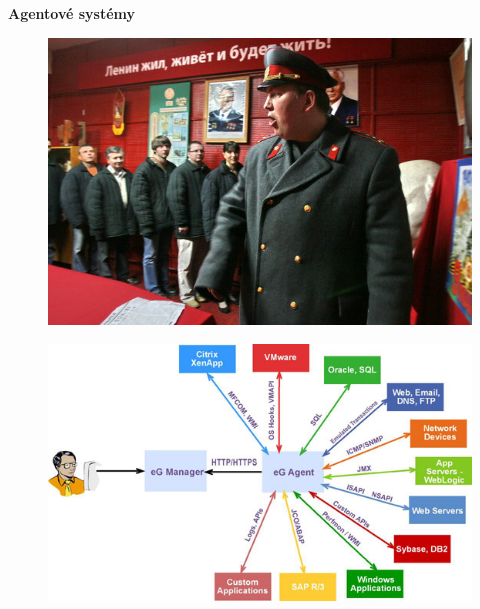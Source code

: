 \documentclass[xcolor=dvipsnames]{beamer}
\begin{document}
\begin{frame}{\bf Agentové systémy}

\begin{minipage}{.5\textwidth}

\begin{figure}[!htb]
\centering
\includegraphics[scale=.2]{../pictures/kgb_agent.jpg}
\end{figure}

\begin{figure}[!htb]
\centering
\includegraphics[scale=.4]{../pictures/software_agent.jpg}
\end{figure}

\end{minipage}%
\begin{minipage}{.5\textwidth}


\end{minipage}
\end{frame}
\end{document}
